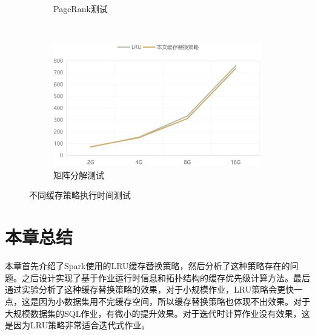 \begin{figure}[!htbp]
\begin{subfigure}[b]{0.45\linewidth}
      \caption{PageRank测试}
      \label{fig:pagerank-cache}
    \end{subfigure}%
    ~%
    \begin{subfigure}[b]{0.45\linewidth}
      \includegraphics[width=\textwidth]{Img/matrix-cache.jpg}
      \caption{矩阵分解测试}
      \label{fig:matrix-cache}
    \end{subfigure}
    \caption{不同缓存策略执行时间测试}
    \label{fig:cache-time}
\end{figure}


\section{本章总结}

本章首先介绍了Spark使用的LRU缓存替换策略，然后分析了这种策略存在的问题。之后设计实现了基于作业运行时信息和拓扑结构的缓存优先级计算方法。最后通过实验分析了这种缓存替换策略的效果，对于小规模作业，LRU策略会更快一点，这是因为小数据集用不完缓存空间，所以缓存替换策略也体现不出效果。对于大规模数据集的SQL作业，有微小的提升效果。对于迭代时计算作业没有效果，这是因为LRU策略非常适合迭代式作业。